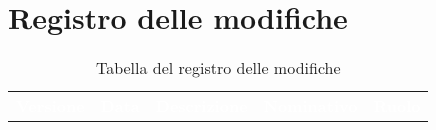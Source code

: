 \renewcommand{\arraystretch}{1.5}

\section*{Registro delle modifiche}
{

\begin{table}[H]
\centering\renewcommand{\arraystretch}{1.5}
\caption{Tabella del registro delle modifiche}
\vspace{0.2cm}
\begin{tabular}{c c  C{4cm} C{4cm}  c }
\textcolor{white}{\textbf{Versione}} & \textcolor{white}{\textbf{Data}} & \textcolor{white}{\textbf{Descrizione}} & \textcolor{white}{\textbf{Nominativo}} & \textcolor{white}{\textbf{Ruolo}}\\


\end{tabular}
\end{table}}
